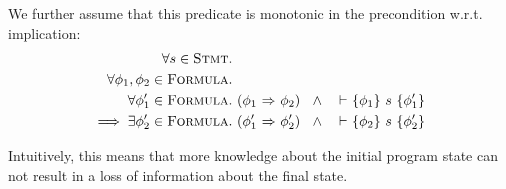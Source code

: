 \begin{description}
    We further assume that this predicate is monotonic in the precondition w.r.t. implication:
    \begin{align*}
    \forall s \in \textup{\textsc{Stmt}}.~& \\
    \forall \phi_1, \phi_2 \in \textup{\textsc{Formula}}.~&\\
    \forall \phi_1' \in \textup{\textsc{Formula}}.~&
    ({\phi_1} \,\,{\Rightarrow}\,\, {\phi_2}) ~~\wedge~ {~} \,\,{\vdash}\,\, \{{\phi_1}\} ~{s}~ \{{\phi_1'}\}\\
    \implies
    \exists \phi_2' \in \textup{\textsc{Formula}}.~&
    ({\phi_1'} \,\,{\Rightarrow}\,\, {\phi_2'}) ~~\wedge~ {~} \,\,{\vdash}\,\, \{{\phi_2}\} ~{s}~ \{{\phi_2'}\}
    \end{align*}
    
    Intuitively, this means that more knowledge about the initial program state can not result in a loss of information about the final state.
    
    \begin{comment}
    \begin{definition}[Weakest Static Precondition]~\\
        Let $\wsp : \setStmt \rightarrow \PP(\setProgramState)$ be defined as
        \begin{displaymath}
        \wsp(s) = \{~ \pi \in \setProgramState_s ~|~ \exists \phi_1, \phi_2 \in \setFormula.~ \thoare{~}{\phi_1}{s}{\phi_2} ~~\wedge~~ \evalphiGen{\pi}{\phi_1} ~\}
        \end{displaymath}
    \end{definition}
    Intuitively, the $\wsp(s)$ is a predicate on program states, indicating whether we could deduce anything about the state after executing $s$, using only our Hoare rules.
    
    Example:
    \begin{itemize}
        \item 
        Given that
        \begin{mathpar}
            \inferrule* [Right=HoareAssign]
            {
                ~
            }
            {
                \thoare {~} {\phi[e/x]} {\sVarAssign {${x}$} {${e}$}} {\phi}
            }
        \end{mathpar}
        is the only Hoare rule for assignment, it follows that
        \begin{displaymath}
        \wsp(\sVarAssign {${x}$} {${e}$}) = \setProgramState
        \end{displaymath}
        

\end{comment}
\end{description}
